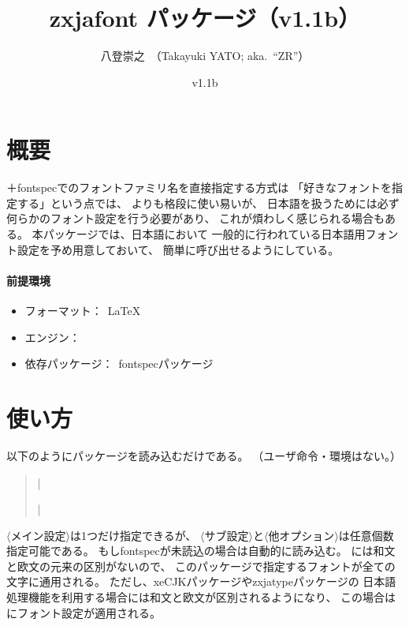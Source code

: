 \documentclass[xelatex,ja=standard,jafont=ipaex,
  a4paper]{bxjsarticle}
\newcommand{\PkgVersion}{1.1b}
\newcommand{\PkgDate}{2020/02/22}
\newcommand{\Pkg}[1]{\textsf{#1}}
\newcommand{\Meta}[1]{$\langle$\mbox{}#1\mbox{}$\rangle$}
\newcommand{\Means}{：\ }
\newcommand{\JEmph}{\textgt}
\begin{document}
\title{\Pkg{zxjafont} パッケージ（v\PkgVersion）}
\author{八登崇之\ （Takayuki YATO; aka.~``ZR''）}
\date{v\PkgVersion\quad[\PkgDate]}
\maketitle

\section{概要}

{\XeLaTeX}＋\Pkg{fontspec}でのフォントファミリ名を直接指定する方式は
「好きなフォントを指定する」という点では、
{\pLaTeX}\>よりも格段に使い易いが、
日本語を扱うためには必ず何らかのフォント設定を行う必要があり、
これが煩わしく感じられる場合もある。
本パッケージでは、日本語\>{\LaTeX}\>において
一般的に行われている日本語用フォント設定を予め用意しておいて、
簡単に呼び出せるようにしている。

\paragraph{前提環境}\mbox{}
\begin{itemize}
\item フォーマット\Means {\LaTeX}
\item エンジン\Means {\XeTeX}
\item 依存パッケージ\Means \Pkg{fontspec}パッケージ
\end{itemize}

\section{使い方}
\label{sec:Usage}

以下のようにパッケージを読み込むだけである。
（ユーザ命令・環境はない。）
\begin{quote}\small
|\usepackage[|\Meta{メイン設定}|,|\Meta{サブ設定}|,|%
\Meta{他オプション}|]{zxjafont}|
\end{quote}

\Meta{メイン設定}は1つだけ指定できるが、
\Meta{サブ設定}と\Meta{他オプション}は任意個数指定可能である。
もし\Pkg{fontspec}が未読込の場合は自動的に読み込む。
{\XeLaTeX}\>には和文と欧文の元来の区別がないので、
このパッケージで指定するフォントが全ての文字に通用される。
ただし、\Pkg{xeCJK}パッケージや\Pkg{zxjatype}パッケージの
日本語処理機能を利用する場合には和文と欧文が区別されるようになり、
この場合は\JEmph{和文のみ}にフォント設定が適用される。
\end{document}
